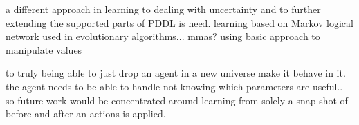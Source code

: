 	a different approach in learning to dealing with uncertainty and to further extending the supported parts of PDDL is need. learning based on Markov logical network used in \cite{zhuo2010a} 
	 evolutionary algorithms... mmas? using basic approach to manipulate values
	
	
 to truly being able to just drop an agent in a new universe make it behave in it. the agent needs to be able to handle not knowing which parameters are useful.. so future work would be concentrated around learning from solely a snap shot of before and after an actions is applied. 

	
	